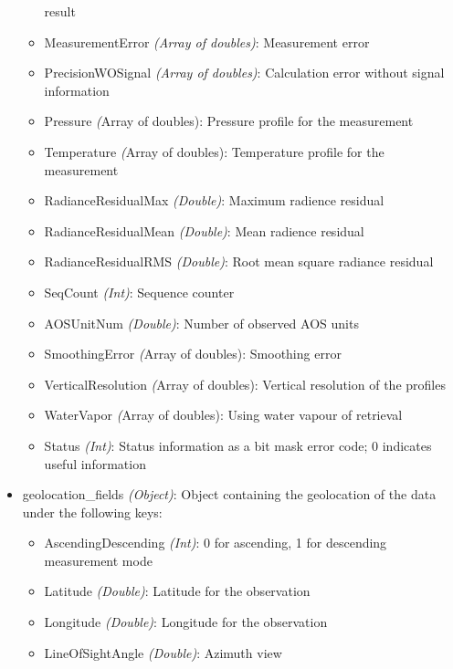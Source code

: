 \begin{itemize}
\begin{itemize}
                result
            \item MeasurementError \emph{(Array of doubles)}: Measurement
                error
            \item PrecisionWOSignal \emph{(Array of doubles)}: Calculation
                error without signal information
            \item Pressure \emph({Array of doubles}): Pressure profile for the
                measurement
            \item Temperature \emph({Array of doubles}): Temperature profile
                for the measurement
            \item RadianceResidualMax \emph{(Double)}: Maximum radience
                residual
            \item RadianceResidualMean \emph{(Double)}: Mean radience residual
            \item RadianceResidualRMS \emph{(Double)}: Root mean square
                radiance residual
            \item SeqCount \emph{(Int)}: Sequence counter
            \item AOSUnitNum \emph{(Double)}: Number of observed AOS units
            \item SmoothingError \emph({Array of doubles}): Smoothing error
            \item VerticalResolution \emph({Array of doubles}): Vertical
                resolution of the profiles
            \item WaterVapor \emph({Array of doubles}): Using water vapour of
                retrieval
            \item Status \emph{(Int)}: Status information as a bit mask error
                code; 0 indicates useful information
        \end{itemize}
    \item geolocation\_fields \emph{(Object)}: Object containing the
        geolocation of the data under the following keys:
        \begin{itemize}
            \item AscendingDescending \emph{(Int)}: 0 for ascending, 1 for
                descending measurement mode
            \item Latitude \emph{(Double)}: Latitude for the observation
            \item Longitude \emph{(Double)}: Longitude for the observation
            \item LineOfSightAngle \emph{(Double)}: Azimuth view

\end{itemize}
\end{itemize}
